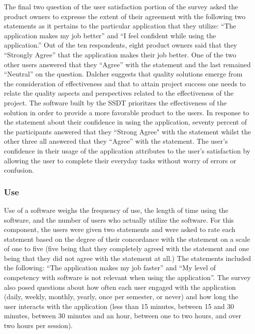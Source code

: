 The final two question of the user satisfaction portion of the survey asked the product owners to expresse the extent of their agreement with the following two statements as it pertains to the particular application that they utilize: ``The application makes my job better'' and ``I feel confident while using the application.'' Out of the ten respondents, eight product owners said that they ``Strongly Agree'' that the application makes their job better. One of the two other users answered that they ``Agree'' with the statement and the last remained ``Neutral'' on the question.  Dalcher \cite{dalcher2009software} suggests that quality solutions emerge from the consideration of effectiveness and that to attain project success one needs to relate the quality aspects and perspectives related to the effectiveness of the project. The software built by the SSDT prioritzes the effectiveness of the solution in order to provide a more favorable product to the users. In response to the statement about their confidence in using the application, seventy percent of the participants answered that they ``Strong Agree" with the statement whilst the other three all answered that they ``Agree'' with the statement. The user's confidence in their usage of the application attributes to the user's satisfaction by allowing the user to complete their everyday tasks without worry of errors or confusion.






 \subsubsection{Use}
Use of a software weighs the frequency of use, the length of time using the software, and the number of users who actually utilize the software. For this component, the users were given two statements and were asked to rate each statement based on the degree of  their concordance with the statement on a scale of one to five (five being that they completely agreed with the statement and one being that they did not agree with the statement at all.) The statements included the following: ``The application makes my job faster'' and ``My level of competency with software is not relevant when using the application''. The survey also posed questions about how often each user engaged with the application (daily, weekly, monthly, yearly, once per semester, or never)  and how long the user interacts with the application (less than 15 minutes, between 15 and 30 minutes, between 30 minutes and an hour, between one to two hours, and over two hours per session).

